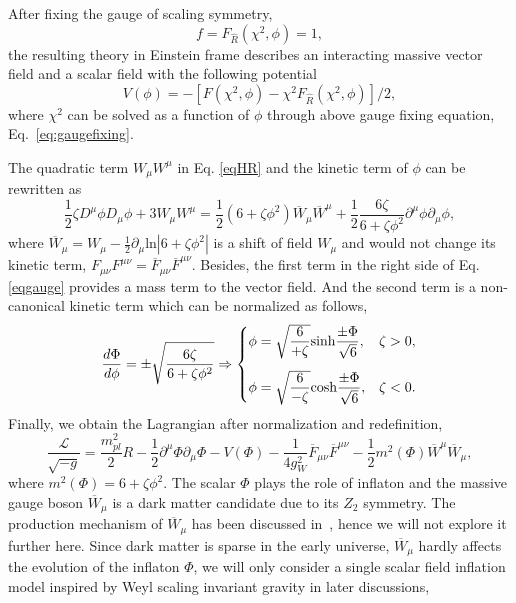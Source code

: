 \documentclass[12pt, a4paper]{article}
\begin{document}
After fixing the gauge of scaling symmetry, 
\begin{equation}\label{eq:gaugefixing}
f=F_{\hat{R}}\left(\chi^2,\phi\right)=1,
\end{equation}
the resulting theory in Einstein frame describes an interacting massive vector field and a scalar field with the following potential
\begin{equation}
    V\left(\phi\right)=-\left[F(\chi^2,\phi)-\chi^2F_{\hat{R}}(\chi^2,\phi)\right]/2,
    \label{VF}
\end{equation}
where $\chi^2$ can be solved as a function of $\phi$ through above gauge fixing equation, Eq.~\ref{eq:gaugefixing}. 

The quadratic term $W_{\mu}W^{\mu}$ in Eq. \ref{eqHR} and the kinetic term of $\phi$ can be rewritten as
\begin{equation}
\label{eqgauge}
\frac{1}{2}\zeta D^{\mu}\phi D_{\mu}\phi+3W_{\mu}W^{\mu}=\frac{1}{2}\left(6+\zeta \phi^2\right)\overline{W}_{\mu}\overline{W}^{\mu}+\frac{1}{2}\frac{6\zeta}{6+\zeta\phi^2}\partial^{\mu}\phi\partial_{\mu}\phi,
\end{equation}
where $\overline{W}_{\mu}=W_{\mu}-\frac{1}{2}\partial_{\mu}\text{ln}\left|6+\zeta\phi^2\right|$ is a shift of field $W_{\mu}$ and would not change its kinetic term, $F_{\mu\nu}F^{\mu\nu}=\overline{F}_{\mu\nu}\overline{F}^{\mu\nu}$.
Besides, the first term in the right side of Eq. \ref{eqgauge} provides a mass term to
the vector field. And the second term is a non-canonical kinetic term which can be normalized as follows,
\begin{equation}
\frac{d\Phi}{d\phi} =\pm \sqrt{\frac{6\zeta}{6+\zeta\phi^2}} \Rightarrow 
 \begin{cases}
	\phi=\sqrt{\dfrac{6}{+\zeta}}\text{sinh}\dfrac{\pm\Phi}{\sqrt{6}}, & \zeta>0,\vspace{0.3cm} \\ 
	\phi=\sqrt{\dfrac{6}{-\zeta}}\text{cosh}\dfrac{\pm\Phi}{\sqrt{6}}, & \zeta<0.
\end{cases}
\end{equation}
Finally, we obtain the Lagrangian after normalization and redefinition,
\begin{equation}
    \frac{\mathcal{L}}{\sqrt{-g}}=\frac{m_{pl}^2}{2}R-\frac{1}{2}\partial^{\mu}\Phi\partial_{\mu}\Phi-V\left(\Phi\right)-\frac{1}{4g_{W}^2}\overline{F}_{\mu\nu}\overline{F}^{\mu\nu}-\frac{1}{2}m^2\left(\Phi\right)\overline{W}^{\mu}\overline{W}_{\mu} ,
\end{equation}
where $m^2\left(\Phi\right)=6+\zeta\phi^2$. The scalar $\Phi$ plays the role of inflaton and the massive gauge boson $\overline W_\mu$ is a dark matter candidate due to its $Z_2$ symmetry. The production mechanism of $\overline W_\mu$ has been discussed in~\cite{Wang:2022ojc}, hence we will not explore it further here. Since dark matter is sparse in the early universe, $\overline W_\mu$ hardly affects the evolution of the inflaton $\Phi$, we will only consider a single scalar field inflation model inspired by Weyl scaling invariant gravity in later discussions,
\end{document}
